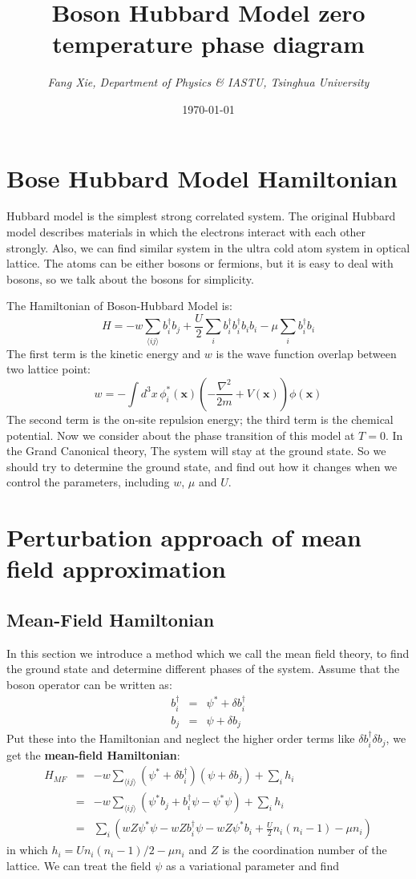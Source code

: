 \documentclass{article}
\author{\emph{Fang Xie, Department of Physics \& IASTU, Tsinghua University}}
\title{{\bf{Boson Hubbard Model zero temperature phase diagram}}}
\date{\today}
\newcommand{\pnx}{\mathbf{x}}
\begin{document}
\maketitle
\section{Bose Hubbard Model Hamiltonian}
Hubbard model is the simplest strong correlated system. The original Hubbard model describes materials in which the electrons interact with each other strongly. Also, we can find similar system in the ultra cold atom system in optical lattice. The atoms can be either bosons or fermions, but it is easy to deal with bosons, so we talk about the bosons for simplicity.

The Hamiltonian of Boson-Hubbard Model is:
\begin{equation}
H = -w\sum_{\langle ij\rangle}b^\dagger_ib_j +\frac{U}{2}\sum_{i}b^\dagger_ib^\dagger_ib_ib_i - \mu \sum_i b^\dagger_i b_i
\end{equation}
The first term is the kinetic energy and $w$ is the wave function overlap between two lattice point:
$$
w = -\int d^3x\, \phi^*_i(\pnx)\left(-\frac{\nabla^2}{2m}+V(\pnx)\right)\phi(\pnx)
$$
The second term is the on-site repulsion energy; the third term is the chemical potential. Now we consider about the phase transition of this model at $T=0$. In the Grand Canonical theory, The system will stay at the ground state. So we should try to determine the ground state, and find out how it changes when we control the parameters, including $w$, $\mu$ and $U$.

\section{Perturbation approach of mean field approximation}
\subsection{Mean-Field Hamiltonian}
In this section we introduce a method which we call the mean field theory, to find the ground state and determine different phases of the system. Assume that the boson operator can be written as:
\begin{eqnarray}
b^\dagger_i& =& \psi^* + \delta b^\dagger_i\\
b_j &= & \psi + \delta b_j
\end{eqnarray}
Put these into the Hamiltonian and neglect the higher order terms like $\delta b^\dagger_i \delta b_j$, we get the {\bf{mean-field Hamiltonian}}:
\begin{eqnarray}
H_{MF} &=& -w \sum_{\langle ij\rangle}(\psi^* + \delta b^\dagger_i)(\psi+ \delta b_j) + \sum_i h_i \nonumber\\
&=& -w\sum_{\langle ij\rangle} \left( \psi^*b_j + b^\dagger_i \psi-\psi^*\psi \right) + \sum_i h_i\nonumber\\
&=& \sum_i \left( wZ\psi^*\psi -wZb^\dagger_i\psi -wZ\psi^*b_i +\frac{U}{2}n_i(n_i-1) - \mu n_i \right)
\end{eqnarray}
in which $h_i = Un_i(n_i-1)/2 -\mu n_i$ and $Z$ is the coordination number of the lattice. We can treat the field $\psi$ as a variational parameter and find
\end{document}
